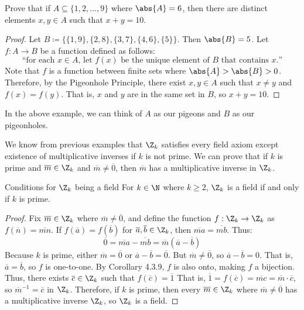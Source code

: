 \documentclass[letterpaper,12pt]{report}
\begin{document}
\begin{exbox}{}{}
    Prove that if $A \subseteq \{1, 2, \ldots, 9\}$ where $\abs{A} = 6$, then there are distinct elements $x, y \in A$ such that $x+y = 10$.
    \tcblower
    \begin{proof}
        Let $B \coloneq \{ \{1,9\}, \{2,8\}, \{3, 7\}, \{4, 6\}, \{5\} \}$. Then $\abs{B} = 5$. Let $f: A \to B$ be a function defined as follows:
        \[\text{``for each $x \in A$, let $f(x)$ be the unique element of $B$ that contains $x$.''}\]
        Note that $f$ is a function between finite sets where $\abs{A} > \abs{B} > 0$. Therefore, by the Pigeonhole Principle, there exist $x,y \in A$ such that $x \neq y$ and $f(x) = f(y)$. That is, $x$ and $y$ are in the same set in $B$, so $x+y = 10$.
    \end{proof}
\end{exbox}

In the above example, we can think of $A$ as our pigeons and $B$ as our pigeonholes.

We know from previous examples that $\Z_k$ satisfies every field axiom except existence of multiplicative inverses if $k$ is not prime. We can prove that if $k$ is prime and $\overline{m} \in \Z_k$ and $\overline{m} \neq \overline{0}$, then $\overline{m}$ has a multiplicative inverse in $\Z_k$.

\begin{thmbox}{Conditions for $\Z_k$ being a field}{}
    For $k \in \N$ where $k \geq 2$, $\Z_k$ is a field if and only if $k$ is prime.
    \tcblower
    \begin{proof}
		Fix $\overline{m} \in \Z_k$ where $\overline{m} \neq \overline{0}$, and define the function $f : \Z_k \to \Z_k$ as $f\left(\overline{n}\right) = \overline{mn}$. If $f\left(\overline{a}\right) = f\left( \overline{b} \right)$ for $\overline{a}, \overline{b} \in \Z_k$, then $\overline{ma} = \overline{mb}$. Thus:
        \[ \overline{0} = \overline{ma} - \overline{mb} = \overline{m} \left( \overline{a} - \overline{b} \right) \]
        Because $k$ is prime, either $\overline{m} = \overline{0}$ or $\overline{a} - \overline{b} = \overline{0}$. But $\overline{m} \neq \overline{0}$, so $\overline{a} - \overline{b} = 0$. That is, $\overline{a} = \overline{b}$, so $f$ is one-to-one. By Corollary 4.3.9, $f$ is also onto, making $f$ a bijection. Thus, there exists $\overline{c} \in \Z_k$ such that $f \left( \overline{c} \right) = \overline{1}$ That is, $\overline{1} = f \left( \overline{c} \right) = \overline{mc} = \overline{m} \cdot \overline{c}$, so $\overline{m}^{-1} = \overline{c}$ in $\Z_k$. Therefore, if $k$ is prime, then every $\overline{m} \in \Z_k$ where $\overline{m} \neq \overline{0}$ has a multiplicative inverse $\Z_k$, so $\Z_k$ is a field.
    \end{proof}
\end{thmbox}
\end{document}
